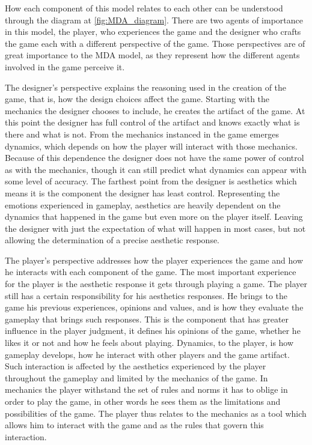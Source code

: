 

How each component of this model relates to each other can be understood through the diagram at \autoref{fig:MDA_diagram}. There are two agents of importance in this model, the player, who experiences the game and the designer who crafts the game each with a different perspective of the game. Those perspectives are of great importance to the MDA model, as they represent how the different agents involved in the game perceive it. 

The designer's perspective explains the reasoning used in the creation of the game, that is, how the design choices affect the game. Starting with the mechanics the designer chooses to include, he creates the artifact of the game. At this point the designer has full control of the artifact and knows exactly what is there and what is not. From the mechanics instanced in the game emerges dynamics, which depends on how the player will interact with those mechanics. Because of this dependence the designer does not have the same power of control as with the mechanics, though it can still predict what dynamics can appear with some level of accuracy. The farthest point from the designer is aesthetics which means it is the component the designer has least control. Representing the emotions experienced in gameplay, aesthetics are heavily dependent on the dynamics that happened in the game but even more on the player itself. Leaving the designer with just the expectation of what will happen in most cases, but not allowing the determination of a precise aesthetic response. 

The player's perspective addresses how the player experiences the game and how he interacts with each component of the game. The most important experience for the player is the aesthetic response it gets through playing a game. The player still has a certain responsibility for his aesthetics responses. He brings to the game his previous experiences, opinions and values, and is how they evaluate the gameplay that brings such responses. This is the component that has greater influence in the player judgment, it defines his opinions of the game, whether he likes it or not and how he feels about playing. Dynamics, to the player, is how gameplay develops, how he interact with other players and the game artifact. Such interaction is affected by the aesthetics experienced by the player throughout the gameplay and limited by the mechanics of the game. In mechanics the player withstand the set of rules and norms it has to oblige in order to play the game, in other words he sees them as the limitations and possibilities of the game. The player thus relates to the mechanics as a tool which allows him to interact with the game and as the rules that govern this interaction. 

